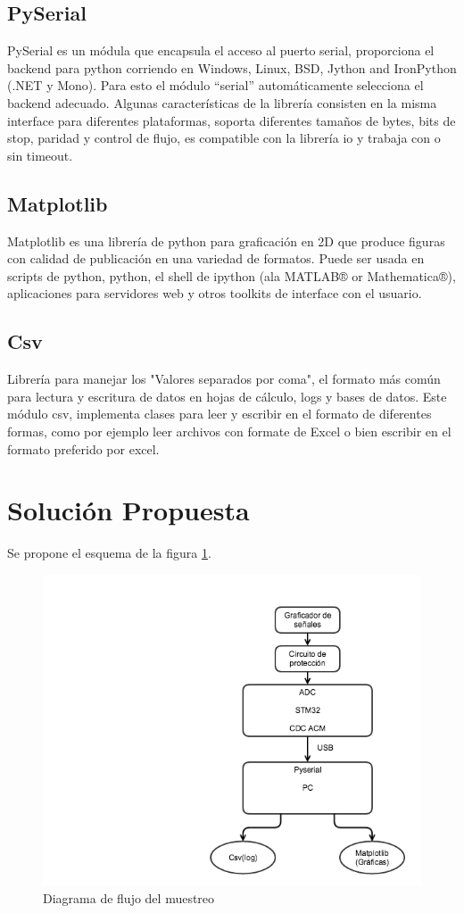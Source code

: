 \documentclass[letterpaper]{article}
\begin{document}
\subsection{PySerial}
PySerial es un módula que encapsula el acceso al puerto serial, proporciona el backend para python corriendo en Windows, Linux, BSD, Jython and IronPython (.NET y Mono). Para esto el módulo “serial” automáticamente selecciona el backend adecuado. Algunas características de la librería consisten en la misma interface para diferentes plataformas, soporta diferentes tamaños de bytes, bits de stop, paridad y control de flujo, es compatible con la librería io y trabaja con o sin timeout.\cite{pyserial} 


\subsection{Matplotlib}
Matplotlib es una librería de python para graficación en 2D que produce figuras con calidad de publicación en una variedad de formatos. Puede ser usada en scripts de python, python, el shell de ipython (ala MATLAB® or Mathematica®), aplicaciones para servidores web y otros toolkits de interface con el usuario. \cite{matplot} 


\subsection{Csv}
Librería para manejar los "Valores separados por coma", el formato más común para lectura y escritura de datos en hojas de cálculo, logs y bases de datos. Este módulo csv, implementa clases para leer y escribir en el formato de diferentes formas, como por ejemplo leer archivos con formate de Excel o bien escribir en el formato preferido por excel.\cite{csv} 

\newpage
\section{Solución Propuesta}
Se propone el esquema de la figura \ref{diag}.
\begin{figure}[hbtp]
\centering
\includegraphics[width=10 cm]{flowdiag.png}
\caption{Diagrama de flujo del muestreo}
\label{diag}
\end{figure}
\end{document}
